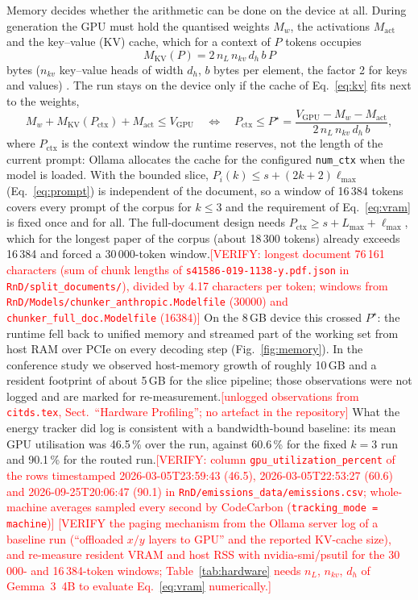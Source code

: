 \documentclass[pdflatex,sn-mathphys-num]{sn-jnl}
\newcommand{\todo}[1]{\textcolor{red}{#1}}
\newcommand{\verify}[1]{\todo{[VERIFY: #1]}}
\theoremstyle{thmstyleone}%
\theoremstyle{thmstylethree}%
\begin{document}
Memory decides whether the arithmetic can be done on the device at all. During generation the GPU must hold the quantised weights $M_w$, the activations $M_{\mathrm{act}}$ and the key--value (KV) cache, which for a context of $P$ tokens occupies
\begin{equation}\label{eq:kv}
M_{\mathrm{KV}}(P)=2\,n_L\,n_{kv}\,d_h\,b\,P
\end{equation}
bytes ($n_{kv}$ key--value heads of width $d_h$, $b$ bytes per element, the factor 2 for keys and values) \cite{pope2023efficiently,ainslie2023gqa}. The run stays on the device only if the cache of Eq.~\eqref{eq:kv} fits next to the weights,
\begin{equation}\label{eq:vram}
M_w+M_{\mathrm{KV}}(P_{\mathrm{ctx}})+M_{\mathrm{act}}\le V_{\mathrm{GPU}}
\quad\Longleftrightarrow\quad
P_{\mathrm{ctx}}\le P^{\star}=\frac{V_{\mathrm{GPU}}-M_w-M_{\mathrm{act}}}{2\,n_L\,n_{kv}\,d_h\,b},
\end{equation}
where $P_{\mathrm{ctx}}$ is the context window the runtime reserves, not the length of the current prompt: Ollama allocates the cache for the configured \texttt{num\_ctx} when the model is loaded. With the bounded slice, $P_i(k)\le s+(2k+2)\ell_{\max}$ (Eq.~\eqref{eq:prompt}) is independent of the document, so a window of 16\,384 tokens covers every prompt of the corpus for $k\le3$ and the requirement of Eq.~\eqref{eq:vram} is fixed once and for all. The full-document design needs $P_{\mathrm{ctx}}\ge s+L_{\max}+\ell_{\max}$, which for the longest paper of the corpus (about 18\,300 tokens) already exceeds 16\,384 and forced a 30\,000-token window.\verify{longest document 76\,161 characters (sum of chunk lengths of \texttt{s41586-019-1138-y.pdf.json} in \texttt{RnD/split\_documents/}), divided by 4.17 characters per token; windows from \texttt{RnD/Models/chunker\_anthropic.Modelfile} (30000) and \texttt{chunker\_full\_doc.Modelfile} (16384)} On the 8\,GB device this crossed $P^{\star}$: the runtime fell back to unified memory and streamed part of the working set from host RAM over PCIe on every decoding step (Fig.~\ref{fig:memory}). In the conference study we observed host-memory growth of roughly 10\,GB and a resident footprint of about 5\,GB for the slice pipeline; those observations were not logged and are marked for re-measurement.\todo{[unlogged observations from \texttt{citds.tex}, Sect.~``Hardware Profiling''; no artefact in the repository]} What the energy tracker did log is consistent with a bandwidth-bound baseline: its mean GPU utilisation was 46.5\,\% over the run, against 60.6\,\% for the fixed $k=3$ run and 90.1\,\% for the routed run.\verify{column \texttt{gpu\_utilization\_percent} of the rows timestamped 2026-03-05T23:59:43 (46.5), 2026-03-05T22:53:27 (60.6) and 2026-09-25T20:06:47 (90.1) in \texttt{RnD/emissions\_data/emissions.csv}; whole-machine averages sampled every second by CodeCarbon (\texttt{tracking\_mode = machine})} \todo{[VERIFY the paging mechanism from the Ollama server log of a baseline run (``offloaded $x/y$ layers to GPU'' and the reported KV-cache size), and re-measure resident VRAM and host RSS with nvidia-smi/psutil for the 30\,000- and 16\,384-token windows; Table~\ref{tab:hardware} needs $n_L$, $n_{kv}$, $d_h$ of Gemma~3~4B to evaluate Eq.~\eqref{eq:vram} numerically.]}
\end{document}
